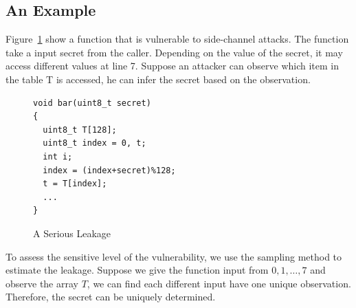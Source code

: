 \subsection{An Example}
Figure~\ref{fig:example1} show a function that is vulnerable to side-channel attacks. The function take a input secret from the caller. Depending on the value of the secret, it may access different values at line 7. Suppose an attacker can observe which item in the table \textsf{T} is accessed, he can infer the secret based on the observation.
\begin{figure}[h]
\begin{minipage}{0.6\linewidth}
\begin{lstlisting}
void bar(uint8_t secret)
{
  uint8_t T[128];
  uint8_t index = 0, t;
  int i;
  index = (index+secret)%128;
  t = T[index];
  ...
}
\end{lstlisting}
\end{minipage}
\hspace{-4pt}
\hfill
\hspace{-4pt}
\begin{minipage}{0.45\linewidth}
\end{minipage}
\caption{A Serious Leakage}\label{fig:example1}
\end{figure}

To assess the sensitive level of the vulnerability, we use the sampling method to estimate the leakage. Suppose we give the function input from $0, 1, \dots, 7$ and observe the array $T$, we can find each different input have one unique observation. Therefore, the secret can be uniquely determined.

